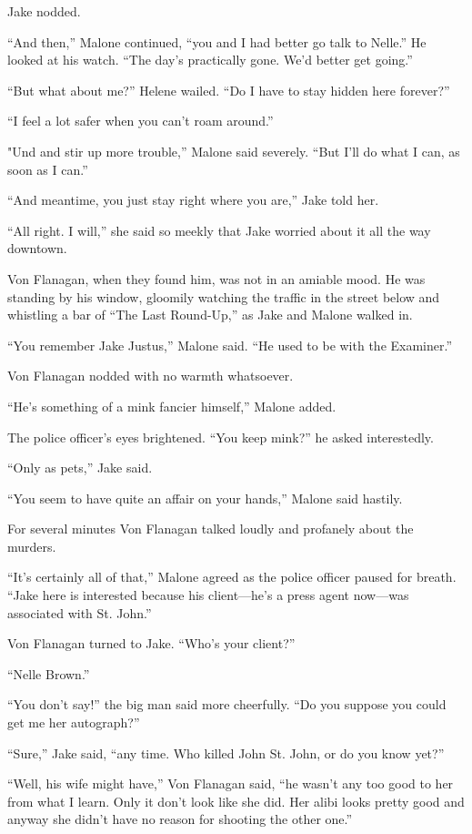 \documentclass{novel}
\begin{document}
Jake nodded.

“And then,” Malone continued, “you and I had better go talk to Nelle.” He looked at his watch. “The day’s practically gone. We’d better get going.”

“But what about me?” Helene wailed. “Do I have to stay hidden here forever?”

“I feel a lot safer when you can’t roam around.”

"Und and stir up more trouble,” Malone said severely. “But I’ll do what I can, as soon as I can.”

“And meantime, you just stay right where you are,” Jake told her.

“All right. I will,” she said so meekly that Jake worried about it all the way downtown.

Von Flanagan, when they found him, was not in an amiable mood. He was standing by his window, gloomily watching the traffic in the street below and whistling a bar of “The Last Round-Up,” as Jake and Malone walked in.

“You remember Jake Justus,” Malone said. “He used to be with the Examiner.”

Von Flanagan nodded with no warmth whatsoever.

“He’s something of a mink fancier himself,” Malone added.

The police officer’s eyes brightened. “You keep mink?” he asked interestedly.

“Only as pets,” Jake said.

“You seem to have quite an affair on your hands,” Malone said hastily.

For several minutes Von Flanagan talked loudly and profanely about the murders.

“It’s certainly all of that,” Malone agreed as the police officer paused for breath. “Jake here is interested because his client—he’s a press agent now—was associated with St. John.”

Von Flanagan turned to Jake. “Who’s your client?”

“Nelle Brown.”

“You don’t say!” the big man said more cheerfully. “Do you suppose you could get me her autograph?”

“Sure,” Jake said, “any time. Who killed John St. John, or do you know yet?”

“Well, his wife might have,” Von Flanagan said, “he wasn’t any too good to her from what I learn. Only it don’t look like she did. Her alibi looks pretty good and anyway she didn’t have no reason for shooting the other one.”
\end{document}
